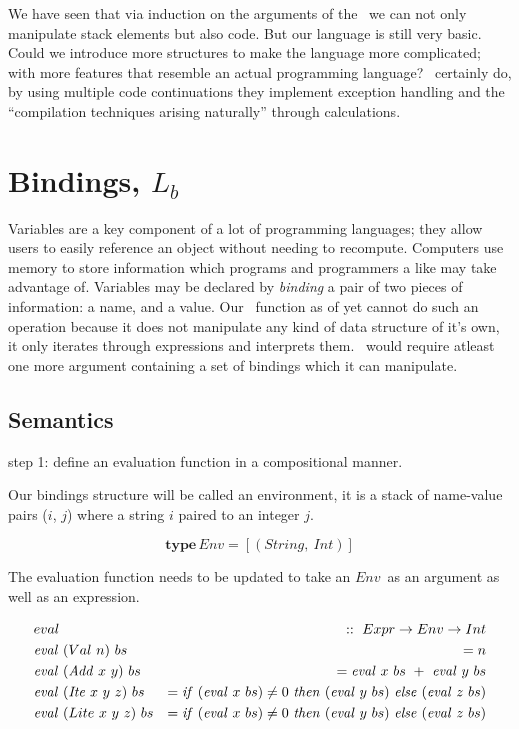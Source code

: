 \documentclass {article}
\begin{document}
We have seen that via 
induction on the arguments of the 
\vm\ we can not only manipulate
stack elements but also code.
But our language is still very
basic.
Could we introduce more structures
to make the language more complicated;
with more features that resemble
an actual programming language?
\BH\ certainly do, by using 
multiple code continuations they
implement exception handling and the
``compilation techniques arising naturally''
through calculations\cite[page 24]{bandh}.

\pagebreak
\section{Bindings, $L_b$} \label{langbind}

Variables are a key component
of a lot of programming languages;
they allow users to easily reference
an object without needing to recompute.
Computers use memory to store information
which programs and programmers a like may
take advantage of.
Variables may be declared by \emph{binding}
a pair of two pieces of information:
a name, and a value.
Our \eval\ function as of yet 
cannot do such an operation
because it does not manipulate any kind of
data structure of it's own,
it only iterates through
expressions and interprets them.
\eval\ would require atleast one more argument
containing a set of bindings which it can
manipulate.

\newcommand{\Context}{\mathit{Context\ }}
\newcommand{\Cxt}{\mathit{Cxt\ }}
\newcommand{\Contextt}{\textit{Context\ }}
\newcommand{\Cxtt}{\textit{Cxt\ }}

\subsection{Semantics}

step 1: define an evaluation 
	function in a compositional manner.

Our bindings structure will be called
an environment, it is a stack
of name-value pairs ($i$, $j$) where
a string $i$ paired to an integer $j$.
\newcommand{\env}{$Env$}

	\[ \textbf{type} \, Env = [(String,\ Int)]\]

The evaluation function needs to be updated
to take an \env\ as an argument as well as
an expression.

\begin{eqnarray*}
	&eval              	   		&::\  Expr \rightarrow Env \rightarrow Int \\
	&\evalf  (Val\ n)\ bs 		&=   n \\
	&\evalf  (\Add x\ y)\ bs		&=   \evalf  x\ bs\ +\ \evalf  y\ bs \\
	&\evalf  (\Ite x\ y\ z)\ bs	&=   \ifff (\evalf  x\ bs) \not= 0\ \tthen (\evalf  y\ bs)\ \eelse (\evalf  z\ bs) \\
	&\evalf  (Lite\ x\ y\ z)\ bs 	&=   \ifff (\evalf  x\ bs) \not= 0\ \tthen (\evalf  y\ bs)\ \eelse (\evalf  z\ bs)
\end{eqnarray*}
\end{document}
